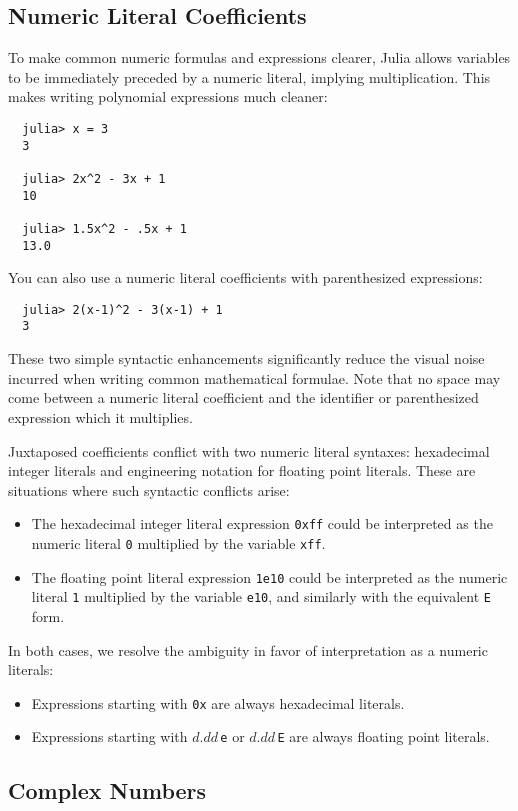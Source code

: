 \documentclass{article}
\begin{document}
\subsection{Numeric Literal Coefficients}

To make common numeric formulas and expressions clearer, Julia allows variables to be immediately preceded by a numeric literal, implying multiplication.
This makes writing polynomial expressions much cleaner:
\begin{verbatim}
  julia> x = 3
  3

  julia> 2x^2 - 3x + 1
  10

  julia> 1.5x^2 - .5x + 1
  13.0
\end{verbatim}
You can also use a numeric literal coefficients with parenthesized expressions:
\begin{verbatim}
  julia> 2(x-1)^2 - 3(x-1) + 1
  3
\end{verbatim}
These two simple syntactic enhancements significantly reduce the visual noise incurred when writing common mathematical formulae.
Note that no space may come between a numeric literal coefficient and the identifier or parenthesized expression which it multiplies.

Juxtaposed coefficients conflict with two numeric literal syntaxes:
hexadecimal integer literals and engineering notation for floating point literals.
These are situations where such syntactic conflicts arise:
\begin{itemize}
\item The hexadecimal integer literal expression \verb|0xff| could be interpreted as the numeric literal \verb|0| multiplied by the variable \verb|xff|.
\item The floating point literal expression \verb|1e10| could be interpreted as the numeric literal \verb|1| multiplied by the variable \verb|e10|, and similarly with the equivalent \verb|E| form.
\end{itemize}
In both cases, we resolve the ambiguity in favor of interpretation as a numeric literals:
\begin{itemize}
\item Expressions starting with \verb|0x| are always hexadecimal literals.
\item Expressions starting with $d.dd$\,\verb|e| or $d.dd$\,\verb|E| are always floating point literals.
\end{itemize}

\subsection{Complex Numbers}
\end{document}
